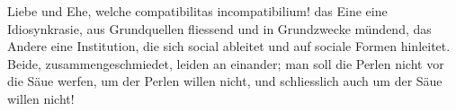 Liebe und Ehe, welche compatibilitas incompatibilium! das Eine eine Idiosynkrasie, aus Grundquellen fliessend und in Grundzwecke mündend, das Andere eine Institution, die sich social ableitet und auf sociale Formen hinleitet. Beide, zusammengeschmiedet, leiden an einander; man soll die Perlen nicht vor die Säue werfen, um der Perlen willen nicht, und schliesslich auch um der Säue willen nicht!
\par

